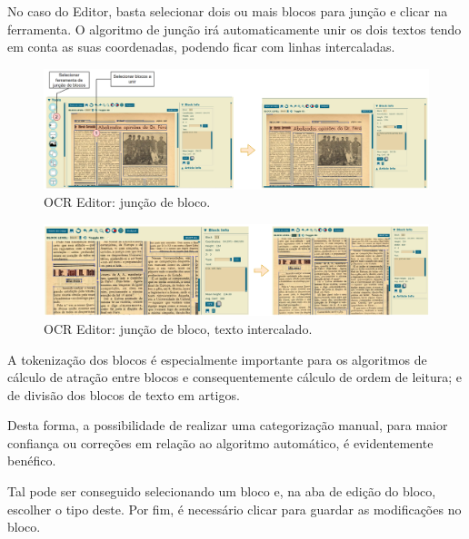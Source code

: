 No caso do Editor, basta selecionar dois ou mais blocos para junção e clicar na ferramenta. O algoritmo de junção irá automaticamente unir os dois textos tendo em conta as suas coordenadas, podendo ficar com linhas intercaladas.

\begin{figure}[H]
	\centering
	\hspace*{-1.8cm}
	\includegraphics[width=1.2\textwidth]{images/ilustracoes/ocr_editor_join_blocks.png}
	\caption{OCR Editor: junção de bloco.}
	\label{fig:ocr_editor_join_blocks}
\end{figure}

\begin{figure}[H]
	\centering
	\hspace*{-1.8cm}
	\includegraphics[width=1.2\textwidth]{images/ilustracoes/ocr_editor_join_blocks_2.png}
	\caption{OCR Editor: junção de bloco, texto intercalado.}
	\label{fig:ocr_editor_join_blocks_2}
\end{figure}



A tokenização dos blocos é especialmente importante para os algoritmos de cálculo de atração entre blocos e consequentemente cálculo de ordem de leitura; e de divisão dos blocos de texto em artigos.

Desta forma, a possibilidade de realizar uma categorização manual, para maior confiança ou correções em relação ao algoritmo automático, é evidentemente benéfico.

Tal pode ser conseguido selecionando um bloco e, na aba de edição do bloco, escolher o tipo deste. Por fim, é necessário clicar para guardar as modificações no bloco.

